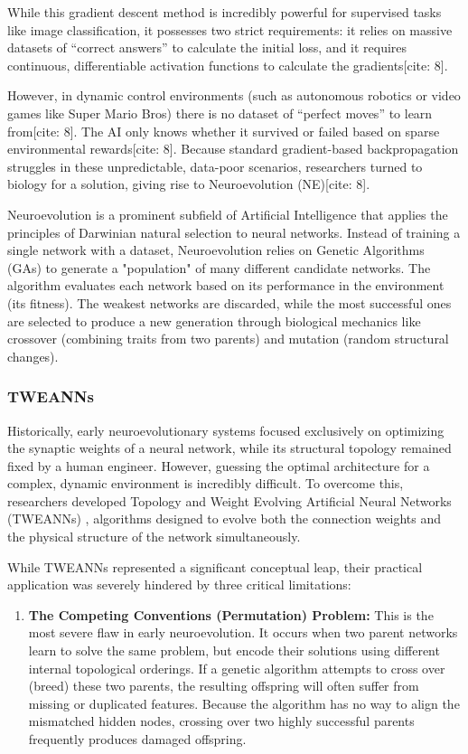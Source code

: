While this gradient descent method is incredibly powerful for supervised tasks like image classification, it possesses two strict requirements: it relies on massive datasets of ``correct answers'' to calculate the initial loss, and it requires continuous, differentiable activation functions to calculate the gradients[cite: 8].

However, in dynamic control environments (such as autonomous robotics or video games like Super Mario Bros) there is no dataset of ``perfect moves'' to learn from[cite: 8]. The AI only knows whether it survived or failed based on sparse environmental rewards[cite: 8]. Because standard gradient-based backpropagation struggles in these unpredictable, data-poor scenarios, researchers turned to biology for a solution, giving rise to Neuroevolution (NE)[cite: 8].

Neuroevolution is a prominent subfield of Artificial Intelligence that applies the principles of Darwinian natural selection to neural networks. Instead of training a single network with a dataset, Neuroevolution relies on Genetic Algorithms (GAs) to generate a "population" of many different candidate networks. The algorithm evaluates each network based on its performance in the environment (its fitness). The weakest networks are discarded, while the most successful ones are selected to produce a new generation through biological mechanics like crossover (combining traits from two parents) and mutation (random structural changes).

\subsubsection{TWEANNs}

Historically, early neuroevolutionary systems focused exclusively on optimizing the synaptic weights of a neural network, while its structural topology remained fixed by a human engineer. However, guessing the optimal architecture for a complex, dynamic environment is incredibly difficult. To overcome this, researchers developed Topology and Weight Evolving Artificial Neural Networks (TWEANNs) \cite{stanley2002}, algorithms designed to evolve both the connection weights and the physical structure of the network simultaneously.

While TWEANNs represented a significant conceptual leap, their practical application was severely hindered by three critical limitations:

\begin{enumerate}
    \item \textbf{The Competing Conventions (Permutation) Problem:} This is the most severe flaw in early neuroevolution. It occurs when two parent networks learn to solve the same problem, but encode their solutions using different internal topological orderings. If a genetic algorithm attempts to cross over (breed) these two parents, the resulting offspring will often suffer from missing or duplicated features. Because the algorithm has no way to align the mismatched hidden nodes, crossing over two highly successful parents frequently produces damaged offspring.
\end{enumerate}

